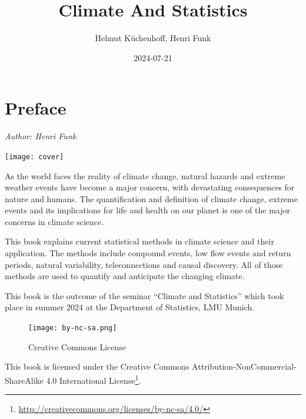 \documentclass[
]{krantz}
\title{Climate And Statistics}
\author{Helmut Küchenhoff, Henri Funk}
\date{2024-07-21}
\renewcommand{\href}[2]{#2\footnote{\url{#1}}}
\begin{document}
\maketitle


\thispagestyle{empty}

\begin{center}
\end{center}

\setlength{\abovedisplayskip}{-5pt}
\setlength{\abovedisplayshortskip}{-5pt}

{
\hypersetup{linkcolor=}
\setcounter{tocdepth}{0}
\tableofcontents
}
\chapter*{Preface}\label{preface}


\emph{Author: Henri Funk}

\begin{center}\texttt{[image: cover]} \end{center}

As the world faces the reality of climate change, natural hazards and extreme weather events have become a major concern, with devastating consequences for nature and humans. The quantification and definition of climate change, extreme events and its implications for life and health on our planet is one of the major concerns in climate science.

This book explains current statistical methods in climate science and their application.
The methods include compound events, low flow events and return periods, natural variability, teleconnections and causal discovery.
All of those methods are used to quantify and anticipate the changing climate.

This book is the outcome of the seminar ``Climate and Statistics'' which took place in summer 2024 at the Department of Statistics, LMU Munich.

\begin{figure}
\centering
\texttt{[image: by-nc-sa.png]}
\caption{Creative Commons License}
\end{figure}

This book is licensed under the \href{http://creativecommons.org/licenses/by-nc-sa/4.0/}{Creative Commons Attribution-NonCommercial-ShareAlike 4.0 International License}.
\end{document}
